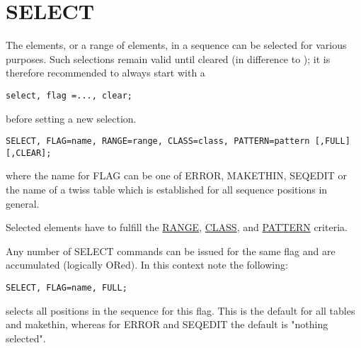 














%
\section{SELECT}
\label{sec:selection}
The elements, or a range of elements, in a sequence can be selected for
various purposes. Such selections remain valid until cleared (in
difference to \madeight); it is therefore recommended to always start with a  

\begin{verbatim}
select, flag =..., clear;
\end{verbatim} 
before setting a new selection. 
\begin{verbatim}
SELECT, FLAG=name, RANGE=range, CLASS=class, PATTERN=pattern [,FULL] [,CLEAR];
\end{verbatim} 
where the name for FLAG can be one of ERROR, MAKETHIN, SEQEDIT or the
name of a twiss table which is established for all sequence positions in
general.  

Selected elements have to fulfill the \href{ranges.html#range}{RANGE},
\href{ranges.html#class}{CLASS}, and \href{wildcard.html}{PATTERN}
criteria.  

Any number of SELECT commands can be issued for the same flag and are
accumulated (logically ORed). In this context note the following:  

\begin{verbatim}
SELECT, FLAG=name, FULL;
\end{verbatim} 
selects all positions in the sequence for this flag. This is the default
for all tables and makethin, whereas for ERROR and SEQEDIT the default
is "nothing selected".  

